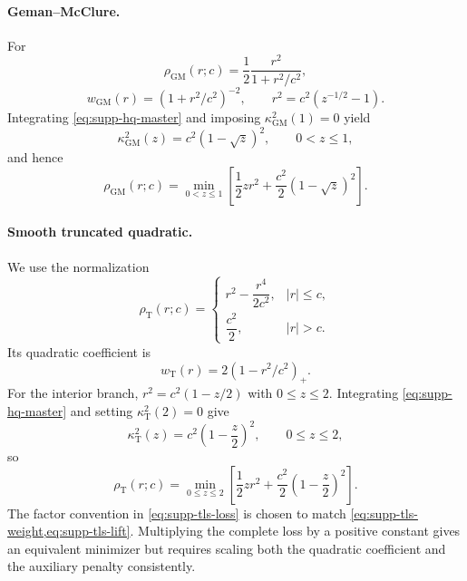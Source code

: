 \documentclass[runningheads]{llncs}
\begin{document}
\paragraph{Geman--McClure.}
For
\begin{equation}
	\rho_{\mathrm{GM}}(r;c)
	=\frac12\frac{r^2}{1+r^2/c^2},
\end{equation}
\begin{equation}
	w_{\mathrm{GM}}(r)
	=\left(1+r^2/c^2\right)^{-2},
	\qquad
	r^2=c^2\left(z^{-1/2}-1\right).
\end{equation}
Integrating \cref{eq:supp-hq-master} and imposing
$\kappa_{\mathrm{GM}}^2(1)=0$ yield
\begin{equation}
	\boxed{
		\kappa_{\mathrm{GM}}^2(z)
		=c^2\left(1-\sqrt z\right)^2,
		\qquad 0<z\le1,
	}
	\label{eq:supp-gm-kappa}
\end{equation}
and hence
\begin{equation}
	\rho_{\mathrm{GM}}(r;c)
	=
	\min_{0<z\le1}
	\left[
		\frac12zr^2
		+\frac{c^2}{2}\left(1-\sqrt z\right)^2
		\right].
	\label{eq:supp-gm-lift}
\end{equation}

\paragraph{Smooth truncated quadratic.}
We use the normalization
\begin{equation}
	\rho_{\mathrm T}(r;c)
	=
	\begin{cases}
		r^2-\dfrac{r^4}{2c^2}, & |r|\le c, \\[4pt]
		\dfrac{c^2}{2},        & |r|>c.
	\end{cases}
	\label{eq:supp-tls-loss}
\end{equation}
Its quadratic coefficient is
\begin{equation}
	w_{\mathrm T}(r)
	=2\left(1-r^2/c^2\right)_+.
	\label{eq:supp-tls-weight}
\end{equation}
For the interior branch,
$r^2=c^2(1-z/2)$ with $0\le z\le2$. Integrating
\cref{eq:supp-hq-master} and setting $\kappa_{\mathrm T}^2(2)=0$ give
\begin{equation}
	\boxed{
		\kappa_{\mathrm T}^2(z)
		=c^2\left(1-\frac z2\right)^2,
		\qquad 0\le z\le2,
	}
	\label{eq:supp-tls-kappa}
\end{equation}
so
\begin{equation}
	\rho_{\mathrm T}(r;c)
	=
	\min_{0\le z\le2}
	\left[
		\frac12zr^2
		+\frac{c^2}{2}\left(1-\frac z2\right)^2
		\right].
	\label{eq:supp-tls-lift}
\end{equation}
The factor convention in \cref{eq:supp-tls-loss} is chosen to match
\cref{eq:supp-tls-weight,eq:supp-tls-lift}. Multiplying the complete loss by
a positive constant gives an equivalent minimizer but requires scaling both
the quadratic coefficient and the auxiliary penalty consistently.
\end{document}
